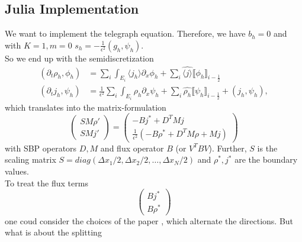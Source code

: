 \subsection{Julia Implementation}
We want to implement the telegraph equation. 
Therefore, we have $b_h=0$ and with $K=1, m=0$ $s_h=-\frac{1}{\epsilon^2}(g_h,\psi_h)$.\\
So we end up with the semidiscretization 
\begin{align*}
(\partial_t\rho_h, \phi_h)&=\sum\limits_i \int_{E_i} \langle j_h \rangle \partial_x \phi_h + \sum_{i} \widehat{\langle j \rangle} \llbracket \phi_h \rrbracket_{i-\frac{1}{2}}\\
(\partial_t j_h, \psi_h)&= \frac{1}{\epsilon^2}\sum_i \int_{E_i} \rho_h \partial_x \psi_h + \sum_i \widehat{ \rho_h} \llbracket \psi_h \rrbracket_{i - \frac{1}{2}} + \left(j_h, \psi_h\right),
\end{align*}
which translates into the matrix-formulation
\begin{equation*}
    \begin{pmatrix}
        SM \rho' \\
        SM j'
    \end{pmatrix} =
    \begin{pmatrix}
        -Bj^*+D^TMj \\
        \frac{1}{\epsilon^2}\left(-B\rho^*+D^TM\rho + Mj\right)
    \end{pmatrix}
\end{equation*}
with SBP operators $D, M$ and flux operator $B$ (or $V^TBV$). Further, $S$ is the scaling matrix $S=diag(\Delta x_1/2, \Delta x_2/2, \hdots, \Delta x_N/2)$ and $\rho^*, j^*$ are the boundary values.\\
To treat the flux terms
\begin{equation*}
\begin{pmatrix}
    Bj^* \\
    B\rho^*
\end{pmatrix}
\end{equation*}
one coud consider the choices of the paper \cite{JaLiQiXi2014}, which alternate the directions. But what is about the splitting

